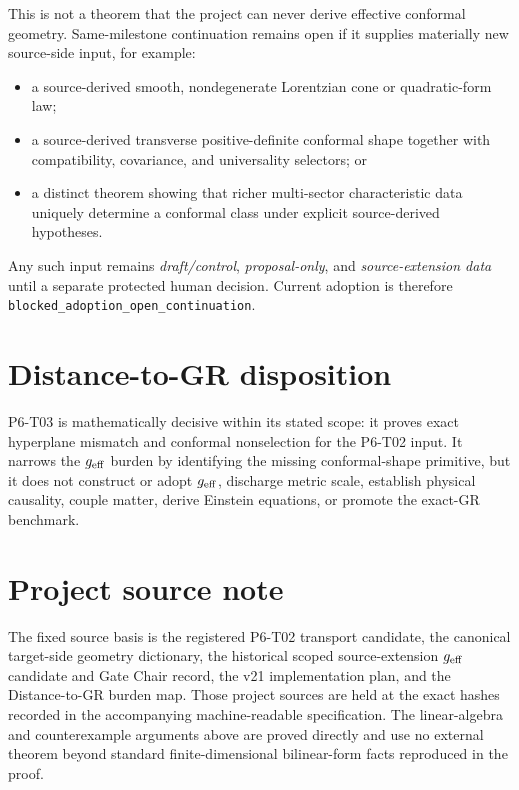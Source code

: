 \documentclass[11pt]{article}
\begin{document}
This is not a theorem that the project can never derive effective conformal
geometry.  Same-milestone continuation remains open if it supplies materially
new source-side input, for example:
\begin{itemize}
\item a source-derived smooth, nondegenerate Lorentzian cone or quadratic-form
law;
\item a source-derived transverse positive-definite conformal shape together
with compatibility, covariance, and universality selectors; or
\item a distinct theorem showing that richer multi-sector characteristic data
uniquely determine a conformal class under explicit source-derived
hypotheses.
\end{itemize}
Any such input remains \emph{draft/control}, \emph{proposal-only}, and
\emph{source-extension data} until a separate protected human decision.
Current adoption is therefore
\texttt{blocked\_adoption\_open\_continuation}.

\section{Distance-to-GR disposition}

P6-T03 is mathematically decisive within its stated scope: it proves exact
hyperplane mismatch and conformal nonselection for the P6-T02 input.  It
narrows the \(g_{\rm eff}\) burden by identifying the missing conformal-shape
primitive, but it does not construct or adopt \(g_{\rm eff}\), discharge
metric scale, establish physical causality, couple matter, derive Einstein
equations, or promote the exact-GR benchmark.

\section{Project source note}

The fixed source basis is the registered P6-T02 transport candidate, the
canonical target-side geometry dictionary, the historical scoped
source-extension \(g_{\rm eff}\) candidate and Gate Chair record, the v21
implementation plan, and the Distance-to-GR burden map.  Those project
sources are held at the exact hashes recorded in the accompanying
machine-readable specification.  The linear-algebra and counterexample
arguments above are proved directly and use no external theorem beyond
standard finite-dimensional bilinear-form facts reproduced in the proof.
\end{document}
